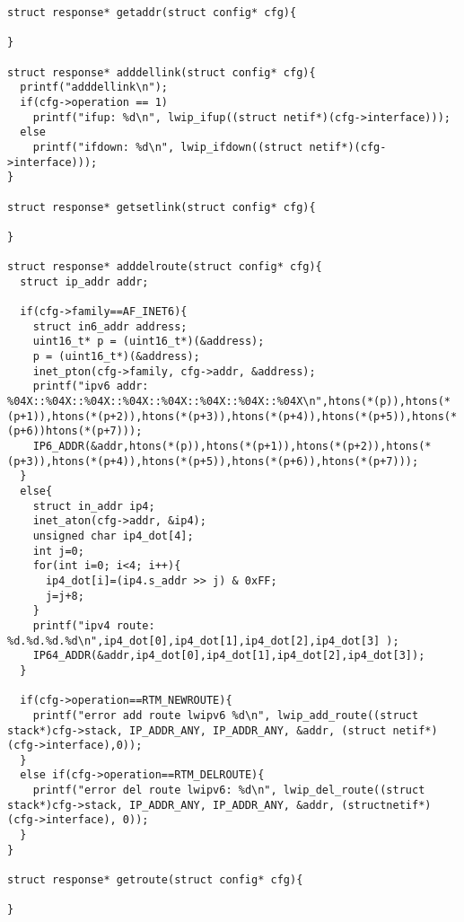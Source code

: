 \begin{lstlisting}[style=CscriptStyle]
struct response* getaddr(struct config* cfg){

}

struct response* adddellink(struct config* cfg){
  printf("adddellink\n");
  if(cfg->operation == 1)
    printf("ifup: %d\n", lwip_ifup((struct netif*)(cfg->interface)));
  else
    printf("ifdown: %d\n", lwip_ifdown((struct netif*)(cfg->interface)));
}

struct response* getsetlink(struct config* cfg){

}

struct response* adddelroute(struct config* cfg){
  struct ip_addr addr;

  if(cfg->family==AF_INET6){
    struct in6_addr address;
    uint16_t* p = (uint16_t*)(&address);
    p = (uint16_t*)(&address);
    inet_pton(cfg->family, cfg->addr, &address);
    printf("ipv6 addr: %04X::%04X::%04X::%04X::%04X::%04X::%04X::%04X\n",htons(*(p)),htons(*(p+1)),htons(*(p+2)),htons(*(p+3)),htons(*(p+4)),htons(*(p+5)),htons(*(p+6))htons(*(p+7)));
    IP6_ADDR(&addr,htons(*(p)),htons(*(p+1)),htons(*(p+2)),htons(*(p+3)),htons(*(p+4)),htons(*(p+5)),htons(*(p+6)),htons(*(p+7)));
  }
  else{
    struct in_addr ip4;
    inet_aton(cfg->addr, &ip4);
    unsigned char ip4_dot[4];
    int j=0;
    for(int i=0; i<4; i++){
      ip4_dot[i]=(ip4.s_addr >> j) & 0xFF;
      j=j+8;
    }
    printf("ipv4 route: %d.%d.%d.%d\n",ip4_dot[0],ip4_dot[1],ip4_dot[2],ip4_dot[3] );
    IP64_ADDR(&addr,ip4_dot[0],ip4_dot[1],ip4_dot[2],ip4_dot[3]);
  }

  if(cfg->operation==RTM_NEWROUTE){
    printf("error add route lwipv6 %d\n", lwip_add_route((struct stack*)cfg->stack, IP_ADDR_ANY, IP_ADDR_ANY, &addr, (struct netif*)(cfg->interface),0));
  }
  else if(cfg->operation==RTM_DELROUTE){
    printf("error del route lwipv6: %d\n", lwip_del_route((struct stack*)cfg->stack, IP_ADDR_ANY, IP_ADDR_ANY, &addr, (structnetif*)(cfg->interface), 0));
  }
}

struct response* getroute(struct config* cfg){

}

\end{lstlisting}

